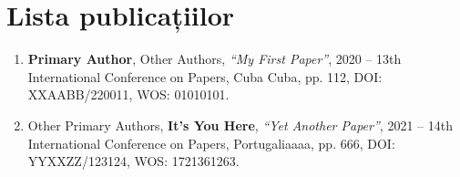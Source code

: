 \section{Lista publicațiilor}
\label{publications:chapter}
{

\begin{enumerate}
\item \textbf{Primary Author}, Other Authors, \textit{``My First Paper''},
2020 -- 13th International Conference on Papers, Cuba Cuba, pp. 112,
DOI: XXAABB/220011, WOS: 01010101.

\item Other Primary Authors, \textbf{It's You Here}, \textit{``Yet Another Paper''},
2021 -- 14th International Conference on Papers, Portugaliaaaa, pp. 666,
DOI: YYXXZZ/123124, WOS: 1721361263.

\end{enumerate}
}

